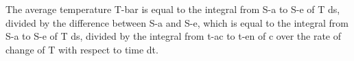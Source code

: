 The average temperature T-bar is equal to the integral from S-a to S-e of T ds, divided by the difference between S-a and S-e, which is equal to the integral from S-a to S-e of T ds, divided by the integral from t-ac to t-en of c over the rate of change of T with respect to time dt.